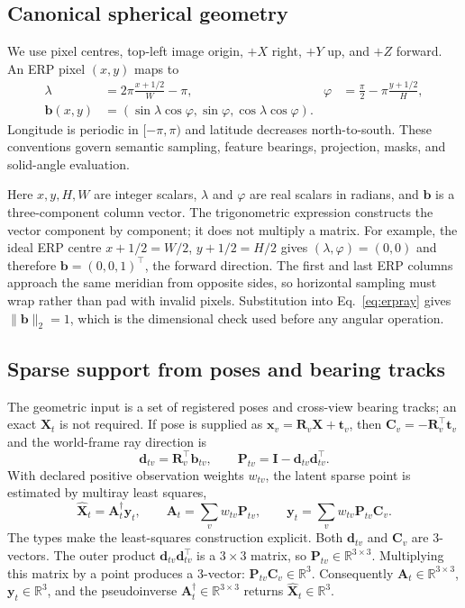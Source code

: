 \documentclass[a4paper,9pt]{extarticle}
\newcommand{\R}{\mathbb R}
\begin{document}
\subsection{Canonical spherical geometry}

We use pixel centres, top-left image origin, $+X$ right, $+Y$ up, and $+Z$ forward. An ERP pixel $(x,y)$ maps to
\begin{align}
 \lambda &=2\pi\frac{x+1/2}{W}-\pi, &
 \varphi &=\frac{\pi}{2}-\pi\frac{y+1/2}{H}, \label{eq:erpangles}\\
 \mathbf b(x,y)&=(\sin\lambda\cos\varphi,
 \sin\varphi,\cos\lambda\cos\varphi). \label{eq:erpray}
\end{align}
Longitude is periodic in $[-\pi,\pi)$ and latitude decreases north-to-south. These conventions govern semantic sampling, feature bearings, projection, masks, and solid-angle evaluation.

Here $x,y,H,W$ are integer scalars, $\lambda$ and $\varphi$ are real
scalars in radians, and $\mathbf b$ is a three-component column vector. The
trigonometric expression constructs the vector component by component; it does
not multiply a matrix. For example, the ideal ERP centre
$x+1/2=W/2$, $y+1/2=H/2$ gives
$(\lambda,\varphi)=(0,0)$ and therefore
$\mathbf b=(0,0,1)^\top$, the forward direction. The first and last ERP
columns approach the same meridian from opposite sides, so horizontal sampling
must wrap rather than pad with invalid pixels. Substitution into
Eq.~\ref{eq:erpray} gives $\|\mathbf b\|_2=1$, which is the dimensional check
used before any angular operation.

\subsection{Sparse support from poses and bearing tracks}

The geometric input is a set of registered poses and cross-view bearing tracks; an exact $\mathbf X_t$ is not required. If pose is supplied as $\mathbf x_v=\mathbf R_v\mathbf X+\mathbf t_v$, then $\mathbf C_v=-\mathbf R_v^\top\mathbf t_v$ and the world-frame ray direction is
\begin{equation}
 \mathbf d_{tv}=\mathbf R_v^\top\mathbf b_{tv},\qquad
 \mathbf P_{tv}=\mathbf I-\mathbf d_{tv}\mathbf d_{tv}^\top.
 \label{eq:worldray}
\end{equation}
With declared positive observation weights $w_{tv}$, the latent sparse point is estimated by multiray least squares,
\begin{equation}
 \widehat{\mathbf X}_t=\mathbf A_t^\dagger\mathbf y_t,\qquad
 \mathbf A_t=\sum_v w_{tv}\mathbf P_{tv},\qquad
 \mathbf y_t=\sum_v w_{tv}\mathbf P_{tv}\mathbf C_v.
 \label{eq:multiray}
\end{equation}
The types make the least-squares construction explicit. Both
$\mathbf d_{tv}$ and $\mathbf C_v$ are 3-vectors. The outer product
$\mathbf d_{tv}\mathbf d_{tv}^{\top}$ is a $3\times3$ matrix, so
$\mathbf P_{tv}\in\R^{3\times3}$. Multiplying this matrix by a point produces
a 3-vector: $\mathbf P_{tv}\mathbf C_v\in\R^3$. Consequently
$\mathbf A_t\in\R^{3\times3}$, $\mathbf y_t\in\R^3$, and the pseudoinverse
$\mathbf A_t^\dagger\in\R^{3\times3}$ returns
$\widehat{\mathbf X}_t\in\R^3$.
\end{document}
